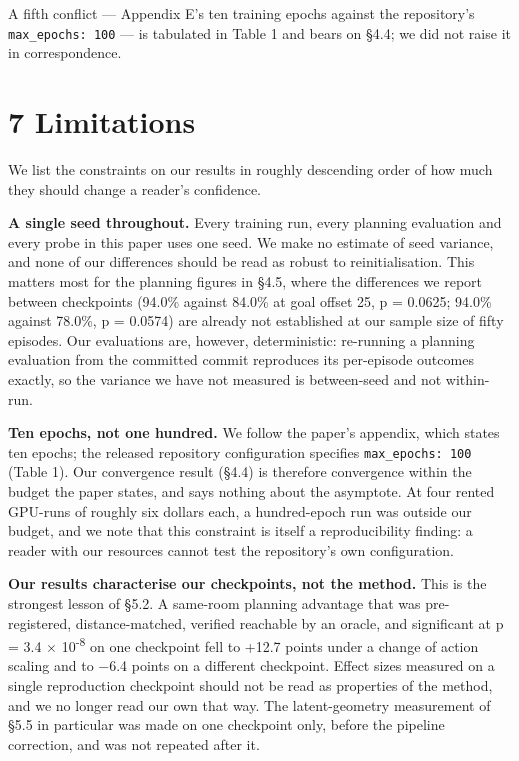 \documentclass[10pt]{article}
\newcounter{none}
\begin{document}
A fifth conflict --- Appendix E's ten training epochs against the repository's
\texttt{max\_epochs:\ 100} --- is tabulated in Table 1 and bears on \S{}4.4; we did not raise
it in correspondence.

\section{7 Limitations}\label{limitations}

We list the constraints on our results in roughly descending order of how much
they should change a reader's confidence.

\textbf{A single seed throughout.} Every training run, every planning evaluation and
every probe in this paper uses one seed. We make no estimate of seed variance,
and none of our differences should be read as robust to reinitialisation. This
matters most for the planning figures in \S{}4.5, where the differences we report
between checkpoints (94.0\% against 84.0\% at goal offset 25, p = 0.0625; 94.0\% against 78.0\%,
p = 0.0574) are already not established at our sample size of fifty episodes.
Our evaluations are, however, deterministic: re-running a planning evaluation
from the committed commit reproduces its per-episode outcomes exactly, so the
variance we have not measured is between-seed and not within-run.

\textbf{Ten epochs, not one hundred.} We follow the paper's appendix, which states
ten epochs; the released repository configuration specifies \texttt{max\_epochs:\ 100}
(Table 1). Our convergence result (\S{}4.4) is therefore convergence within the
budget the paper states, and says nothing about the asymptote. At four rented
GPU-runs of roughly six dollars each, a hundred-epoch run was outside our
budget, and we note that this constraint is itself a reproducibility finding: a
reader with our resources cannot test the repository's own configuration.

\textbf{Our results characterise our checkpoints, not the method.} This is the
strongest lesson of \S{}5.2. A same-room planning advantage that was pre-registered,
distance-matched, verified reachable by an oracle, and significant at
p = 3.4 $\times$ 10\textsuperscript{-8} on one checkpoint fell to +12.7 points under a change of action
scaling and to $-$6.4 points on a different checkpoint. Effect sizes measured on a
single reproduction checkpoint should not be read as properties of the method,
and we no longer read our own that way. The latent-geometry measurement of \S{}5.5 in particular was made on one
checkpoint only, before the pipeline correction, and was not repeated after it.
\end{document}
